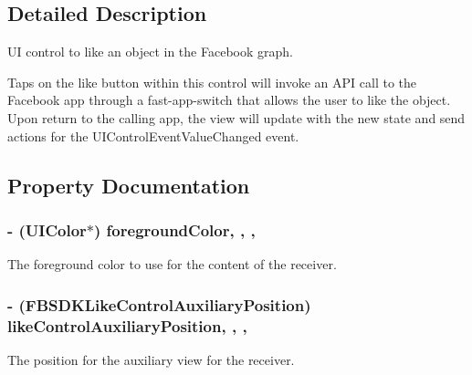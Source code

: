 \subsection{Detailed Description}
U\-I control to like an object in the Facebook graph.

Taps on the like button within this control will invoke an A\-P\-I call to the Facebook app through a fast-\/app-\/switch that allows the user to like the object. Upon return to the calling app, the view will update with the new state and send actions for the U\-I\-Control\-Event\-Value\-Changed event. 

\subsection{Property Documentation}
\hypertarget{interface_f_b_s_d_k_like_control_a078c28c8d5545d68a6887dc6ce3cd32d}{
\subsubsection[{foreground\-Color}]{\setlength{\rightskip}{0pt plus 5cm}-\/ (U\-I\-Color$\ast$) foreground\-Color\hspace{0.3cm}{\ttfamily [read]}, {\ttfamily [write]}, {\ttfamily [nonatomic]}, {\ttfamily [strong]}}}\label{interface_f_b_s_d_k_like_control_a078c28c8d5545d68a6887dc6ce3cd32d}
The foreground color to use for the content of the receiver. \hypertarget{interface_f_b_s_d_k_like_control_a3084afe9f906160458653d82544dd772}{
\subsubsection[{like\-Control\-Auxiliary\-Position}]{\setlength{\rightskip}{0pt plus 5cm}-\/ (F\-B\-S\-D\-K\-Like\-Control\-Auxiliary\-Position) like\-Control\-Auxiliary\-Position\hspace{0.3cm}{\ttfamily [read]}, {\ttfamily [write]}, {\ttfamily [nonatomic]}, {\ttfamily [assign]}}}\label{interface_f_b_s_d_k_like_control_a3084afe9f906160458653d82544dd772}
The position for the auxiliary view for the receiver.

